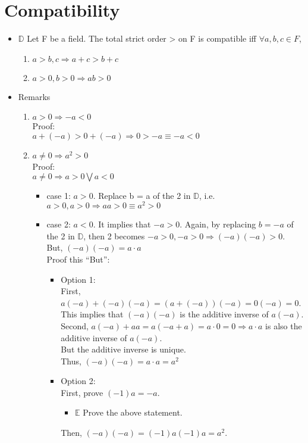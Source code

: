 \documentclass[11pt]{article}
\begin{document}
\section{Compatibility}
\label{sec:orge2ba5ca}
\begin{itemize}
\item \(\mathbb{D}\) Let F be a field. The total strict order > on F is compatible iff \(\forall a,b,c \in F\),
\begin{enumerate}
\item \(a > b, c \Rightarrow a+c > b+c\)
\item \(a > 0, b > 0 \Rightarrow ab > 0\)
\end{enumerate}

\item Remarks
\begin{enumerate}
\item \(a > 0 \Rightarrow -a < 0\)\\[0pt]
Proof:\\[0pt]
\(a + (-a) > 0 + (-a) \Rightarrow 0 > -a \equiv -a < 0\)
\item \(a \neq 0 \Rightarrow a^{2} > 0\) \\[0pt]
Proof:\\[0pt]
\(a \neq 0 \Rightarrow a > 0 \bigvee a < 0\)\\[0pt]
\begin{itemize}
\item case 1: \(a > 0\). Replace b = a of the 2 in \(\mathbb{D}\), i.e. \(a > 0, a >0 \Rightarrow aa > 0 \equiv a^{2} > 0\)\\[0pt]
\item case 2: \(a < 0\). It implies that \(-a > 0\). Again, by replacing \(b = -a\) of the 2 in \(\mathbb{D}\), then 2 becomes \(-a > 0, -a >0 \Rightarrow (-a)(-a) >0\).\\[0pt]
But, \((-a)(-a) = a\cdot a\)\\[0pt]
Proof this ``But'':\\[0pt]
\begin{itemize}
\item Option 1:\\[0pt]
First, \(a(-a) + (-a)(-a) = (a + (-a))(-a) = 0(-a) = 0\). This implies that \((-a)(-a)\) is the additive inverse of \(a(-a)\).\\[0pt]
Second, \(a(-a) + aa = a(-a + a) = a\cdot 0 = 0 \Rightarrow a\cdot a\) is also the additive inverse of \(a(-a)\).\\[0pt]
But the additive inverse is unique.\\[0pt]
Thus, \((-a)(-a) = a\cdot a = a^{2}\)

\item Option 2:\\[0pt]
First, prove \((-1)a = -a\).\\[0pt]
\begin{itemize}
\item \(\mathbb{E}\) Prove the above statement.
\end{itemize}
Then, \((-a)(-a) = (-1)a(-1)a = a^{2}\).
\end{itemize}
\end{itemize}
\end{enumerate}
\end{itemize}
\end{document}
